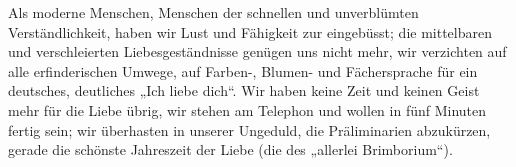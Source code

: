 Als moderne Menschen, Menschen der schnellen und unverblümten Verständlichkeit, haben wir Lust und Fähigkeit zur  eingebüsst; die mittelbaren und verschleierten Liebesgeständnisse genügen uns nicht mehr, wir verzichten auf alle erfinderischen Umwege, auf Farben-, Blumen- und Fächersprache für ein deutsches, deutliches „Ich liebe dich“. Wir haben keine Zeit und keinen Geist mehr für die Liebe übrig, wir stehen am Telephon und wollen in fünf Minuten fertig sein; wir überhasten in unserer Ungeduld, die Präliminarien abzukürzen, gerade die schönste Jahreszeit der Liebe (die des „allerlei Brimborium“).
\par

